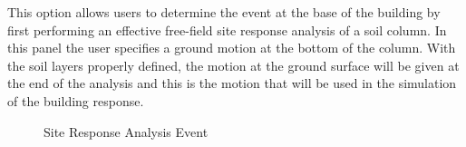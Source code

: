 This option allows users to determine the event at the base of the 
building by first performing an effective free-field  site response 
analysis of a soil column. In this panel the user specifies a ground 
motion at the bottom of the column. With the soil layers properly 
defined, the motion at the ground surface will be given at the end 
of the analysis and this is the motion that will be used in the 
simulation of the building response. 

\begin{figure}[!htbp]
  \caption{Site Response Analysis Event}
  \label{fig:s3hark1}
\end{figure}

